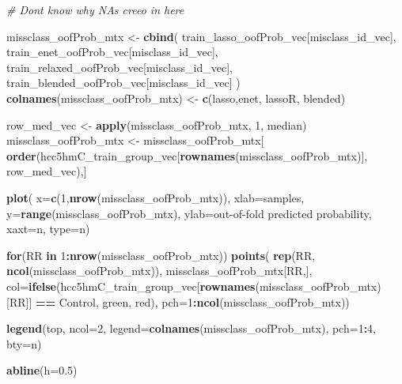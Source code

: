 \documentclass[
]{book}
\newenvironment{Shaded}{\begin{snugshade}}{\end{snugshade}}
\newcommand{\CommentTok}[1]{\textcolor[rgb]{0.56,0.35,0.01}{\textit{#1}}}
\newcommand{\ControlFlowTok}[1]{\textcolor[rgb]{0.13,0.29,0.53}{\textbf{#1}}}
\newcommand{\DataTypeTok}[1]{\textcolor[rgb]{0.13,0.29,0.53}{#1}}
\newcommand{\DecValTok}[1]{\textcolor[rgb]{0.00,0.00,0.81}{#1}}
\newcommand{\FloatTok}[1]{\textcolor[rgb]{0.00,0.00,0.81}{#1}}
\newcommand{\KeywordTok}[1]{\textcolor[rgb]{0.13,0.29,0.53}{\textbf{#1}}}
\newcommand{\NormalTok}[1]{#1}
\newcommand{\OperatorTok}[1]{\textcolor[rgb]{0.81,0.36,0.00}{\textbf{#1}}}
\newcommand{\StringTok}[1]{\textcolor[rgb]{0.31,0.60,0.02}{#1}}
\begin{document}
\begin{Shaded}
\begin{Highlighting}[]
\CommentTok{\# Dont know why NAs creeo in here}

\NormalTok{missclass\_oofProb\_mtx <{-}}\StringTok{ }\KeywordTok{cbind}\NormalTok{(}
\NormalTok{ train\_lasso\_oofProb\_vec[misclass\_id\_vec],}
\NormalTok{ train\_enet\_oofProb\_vec[misclass\_id\_vec],}
\NormalTok{ train\_relaxed\_oofProb\_vec[misclass\_id\_vec],}
\NormalTok{ train\_blended\_oofProb\_vec[misclass\_id\_vec]}
\NormalTok{)}
\KeywordTok{colnames}\NormalTok{(missclass\_oofProb\_mtx) <{-}}\StringTok{ }\KeywordTok{c}\NormalTok{(}\StringTok{\textquotesingle{}lasso\textquotesingle{}}\NormalTok{,}\StringTok{\textquotesingle{}enet\textquotesingle{}}\NormalTok{, }\StringTok{\textquotesingle{}lassoR\textquotesingle{}}\NormalTok{, }\StringTok{\textquotesingle{}blended\textquotesingle{}}\NormalTok{)}


\NormalTok{row\_med\_vec <{-}}\StringTok{ }\KeywordTok{apply}\NormalTok{(missclass\_oofProb\_mtx, }\DecValTok{1}\NormalTok{, median)}
\NormalTok{missclass\_oofProb\_mtx <{-}}\StringTok{ }\NormalTok{missclass\_oofProb\_mtx[}
  \KeywordTok{order}\NormalTok{(hcc5hmC\_train\_group\_vec[}\KeywordTok{rownames}\NormalTok{(missclass\_oofProb\_mtx)], row\_med\_vec),]}

\KeywordTok{plot}\NormalTok{(}
 \DataTypeTok{x=}\KeywordTok{c}\NormalTok{(}\DecValTok{1}\NormalTok{,}\KeywordTok{nrow}\NormalTok{(missclass\_oofProb\_mtx)), }\DataTypeTok{xlab=}\StringTok{\textquotesingle{}samples\textquotesingle{}}\NormalTok{,}
 \DataTypeTok{y=}\KeywordTok{range}\NormalTok{(missclass\_oofProb\_mtx), }\DataTypeTok{ylab=}\StringTok{\textquotesingle{}out{-}of{-}fold predicted probability\textquotesingle{}}\NormalTok{,}
 \DataTypeTok{xaxt=}\StringTok{\textquotesingle{}n\textquotesingle{}}\NormalTok{, }\DataTypeTok{type=}\StringTok{\textquotesingle{}n\textquotesingle{}}\NormalTok{)}

\ControlFlowTok{for}\NormalTok{(RR }\ControlFlowTok{in} \DecValTok{1}\OperatorTok{:}\KeywordTok{nrow}\NormalTok{(missclass\_oofProb\_mtx))}
\KeywordTok{points}\NormalTok{(}
 \KeywordTok{rep}\NormalTok{(RR, }\KeywordTok{ncol}\NormalTok{(missclass\_oofProb\_mtx)), }
\NormalTok{ missclass\_oofProb\_mtx[RR,],}
 \DataTypeTok{col=}\KeywordTok{ifelse}\NormalTok{(hcc5hmC\_train\_group\_vec[}\KeywordTok{rownames}\NormalTok{(missclass\_oofProb\_mtx)[RR]] }\OperatorTok{==}\StringTok{ \textquotesingle{}Control\textquotesingle{}}\NormalTok{,}
  \StringTok{\textquotesingle{}green\textquotesingle{}}\NormalTok{, }\StringTok{\textquotesingle{}red\textquotesingle{}}\NormalTok{),}
 \DataTypeTok{pch=}\DecValTok{1}\OperatorTok{:}\KeywordTok{ncol}\NormalTok{(missclass\_oofProb\_mtx))}

\KeywordTok{legend}\NormalTok{(}\StringTok{\textquotesingle{}top\textquotesingle{}}\NormalTok{, }\DataTypeTok{ncol=}\DecValTok{2}\NormalTok{, }\DataTypeTok{legend=}\KeywordTok{colnames}\NormalTok{(missclass\_oofProb\_mtx), }
 \DataTypeTok{pch=}\DecValTok{1}\OperatorTok{:}\DecValTok{4}\NormalTok{, }\DataTypeTok{bty=}\StringTok{\textquotesingle{}n\textquotesingle{}}\NormalTok{)}

\KeywordTok{abline}\NormalTok{(}\DataTypeTok{h=}\FloatTok{0.5}\NormalTok{)}
\end{Highlighting}
\end{Shaded}
\end{document}
